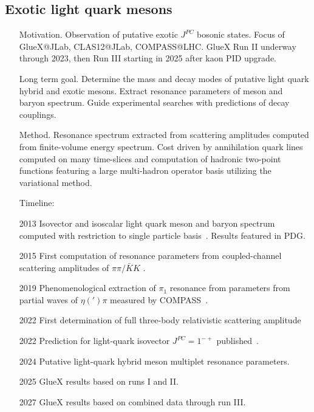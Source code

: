 \documentclass{article}
\begin{document}
\subsection{Exotic light quark mesons}
\begin{itemize}
    \item[Motivation.] Observation of putative exotic $J^{PC}$ bosonic
      states. Focus of GlueX@JLab, CLAS12@JLab, COMPASS@LHC. GlueX Run
      II underway through 2023, then Run III starting in 2025 after
      kaon 
PID upgrade.
    \item[Long term goal.] Determine the mass and decay modes of
      putative light quark hybrid and exotic mesons. Extract resonance
      parameters of meson and baryon spectrum. Guide experimental
      searches with predictions of decay couplings.
    \item[Method.] Resonance spectrum extracted from scattering
      amplitudes computed from finite-volume energy spectrum. Cost
      driven by annihilation quark lines computed on many
      time-slices and computation of hadronic two-point functions
      featuring a large multi-hadron operator basis utilizing the variational method. 
\item[Timeline:]
    \item[2013] Isovector and isoscalar light quark meson and baryon
      spectrum computed with restriction to single particle basis~\cite{Dudek:2013yja}. Results featured in PDG.
    \item[2015] First computation of resonance parameters from coupled-channel scattering
      amplitudes of $\pi\pi/\bar{K}K$ \cite{Wilson:2015dqa}.
    \item[2019] Phenomenological extraction of $\pi_1$ resonance from 
      parameters from partial waves of $\eta(')\pi$ measured by COMPASS~\cite{JPAC:2018zyd}.
    \item[2022] First determination of full three-body relativistic scattering amplitude~\cite{Hansen:2020otl}
    \item[2022] Prediction for light-quark isovector $J^{PC}=1^{-+}$ published~\cite{Woss:2020ayi}.
    \item[2024] Putative light-quark hybrid meson multiplet resonance parameters.
    \item[2025] GlueX results based on runs I and II. 
    \item[2027] GlueX results based on combined data through run III.
\end{itemize}
\end{document}
